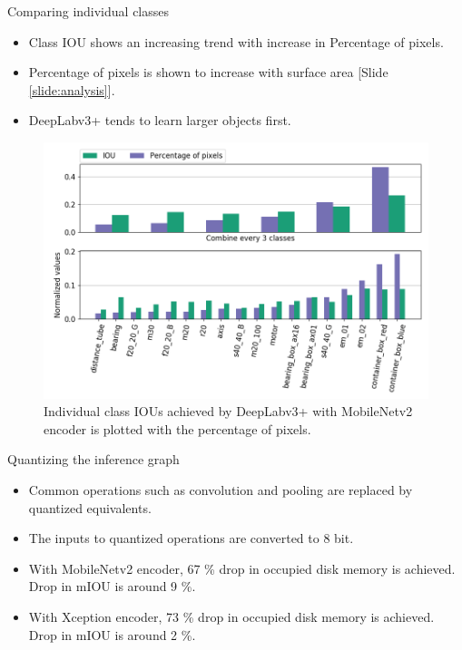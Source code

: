 \documentclass{beamer}
\begin{document}
\begin{frame}{Comparing individual classes}
	\begin{small}
		\begin{itemize}
			\item Class IOU shows an increasing trend with increase in Percentage of pixels.
			\item Percentage of pixels is shown to increase with surface area [Slide \ref{slide:analysis}].
			\item DeepLabv3+ tends to learn larger objects first.
		\end{itemize}
	\end{small}

	\begin{figure}[h]
		\centering
		\includegraphics[width=0.57\linewidth]{images/cls_iou_full}
		\captionsetup{justification=centering,margin=0.2cm}
		\caption{Individual class IOUs achieved by DeepLabv3+ with MobileNetv2 encoder is plotted with the percentage of pixels.}
		\label{Fig:variants}
	\end{figure}

\end{frame}


\begin{frame}{Quantizing the inference graph}
	\begin{small}
		\begin{itemize}
			\item Common operations such as convolution and pooling are replaced by quantized equivalents.
			\item The inputs to quantized operations are converted to 8 bit.
			\item With MobileNetv2 encoder, 67 \% drop in occupied disk memory is achieved. Drop in mIOU is around 9 \%.
			\item With Xception encoder, 73 \% drop in occupied disk memory is achieved. Drop in mIOU is around 2 \%.
		\end{itemize}
	\end{small}
	
	
\end{frame}
\end{document}
